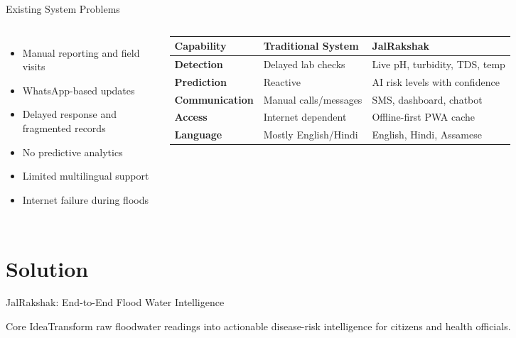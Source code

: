 \documentclass[aspectratio=169,11pt]{beamer}
\begin{document}
\begin{frame}{Existing System Problems}
\begin{columns}[T]
\begin{itemize}\item Manual reporting and field visits\item WhatsApp-based updates\item Delayed response and fragmented records\item No predictive analytics\item Limited multilingual support\item Internet failure during floods\end{itemize}
\small\begin{tabularx}{\linewidth}{>{\bfseries}p{2.8cm}XX}\toprule
Capability & Traditional System & JalRakshak \\\midrule
Detection & Delayed lab checks & Live pH, turbidity, TDS, temp \\
Prediction & Reactive & AI risk levels with confidence \\
Communication & Manual calls/messages & SMS, dashboard, chatbot \\
Access & Internet dependent & Offline-first PWA cache \\
Language & Mostly English/Hindi & English, Hindi, Assamese \\
\bottomrule\end{tabularx}
\end{columns}
\end{frame}

\section{Solution}
\begin{frame}{JalRakshak: End-to-End Flood Water Intelligence}
\centering
{}
\vspace{0.35cm}
\begin{block}{Core Idea}\centering Transform raw floodwater readings into actionable disease-risk intelligence for citizens and health officials.\end{block}
\end{frame}
\end{document}
